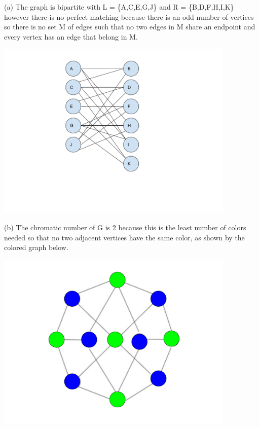 \documentclass{article}
\begin{document}
\begin{solution}

\noindent (a) The graph is bipartite with L = \{A,C,E,G,J\} and R = \{B,D,F,H,I,K\} however there is no perfect matching because 
there is an odd number of vertices so there is no set M of edges such that no two edges in M share an endpoint and every vertex has an edge that belong in M.

\begin{center}
\includegraphics[width=4.5in]{HW5_pics/HW5Solution3a.pdf}
\end{center}

\noindent (b) The chromatic number of G is 2 because this is the least number of colors needed so that no two adjacent vertices have the same color, as shown by the colored graph below.

\begin{center}
\includegraphics[width=4.5in]{HW5_pics/HW5Solution3b.pdf}
\end{center}


\end{solution}
\end{document}

